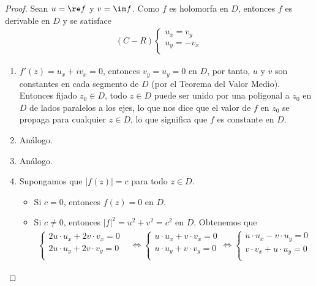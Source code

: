 \begin{proof}
Sean $u = \re f$ y $v = \im f$. Como $f$ es holomorfa en $D$, entonces $f$ es derivable en $D$ y se satisface
\begin{align*}
    (C-R) \left\{ \begin{array}{lcc}
            u_x = v_y \\
            u_y = -v_x\\
             \end{array}
        \right.
\end{align*}
\begin{enumerate}
    \item $f'(z) = u_x + iv_x = 0$, entonces $v_y = u_y = 0$ en $D$, por tanto, $u$ y $v$ son constantes en cada segmento de $D$ (por el Teorema del Valor Medio). Entonces fijado $z_0 \in D$, todo $z \in D$ puede ser unido por una poligonal a $z_0$ en $D$ de lados paralelos a los ejes, lo que nos dice que el valor de $f$ en $z_0$ se propaga para cualquier $z \in D$, lo que significa que $f$ es constante en $D$.
    \item Análogo.
    \item Análogo.
    \item Supongamos que $|f(z)| = c$ para todo $z \in D$.
    \begin{itemize}
        \item Si $c = 0$, entonces $f(z) = 0$ en $D$.
        \item Si $c \not = 0$, entonces $|f|^2 = u^2 + v^2 = c^2$ en $D$. Obtenemos que
        \begin{align*}
            \left\{ \begin{array}{lcc}
            2u \cdot u_x + 2v \cdot v_x = 0\\
            2u \cdot u_y + 2v \cdot v_y = 0\\
             \end{array}
        \right. & \Longleftrightarrow \left\{ \begin{array}{lcc}
            u \cdot u_x + v \cdot v_x = 0\\
            u \cdot u_y + v \cdot v_y = 0\\
             \end{array}
        \right. \Longleftrightarrow \left\{ \begin{array}{lcc}
            u \cdot u_x - v \cdot u_y = 0\\
            v \cdot v_x + u \cdot u_y  = 0\\
             \end{array}

\end{align*}
\end{itemize}
\end{enumerate}
\end{proof}
